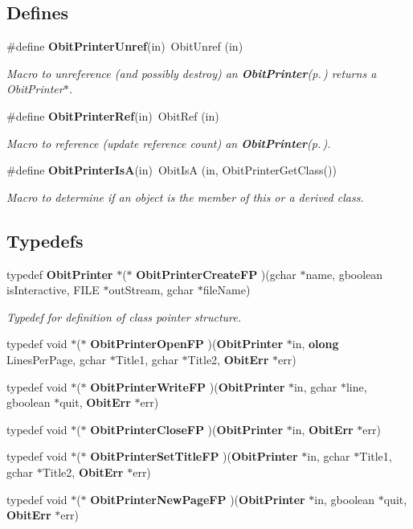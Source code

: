 \subsection*{Defines}
\begin{CompactItemize}
\item 
\#define {\bf Obit\-Printer\-Unref}(in)\ Obit\-Unref (in)
\begin{CompactList}\small\item\em Macro to unreference (and possibly destroy) an {\bf Obit\-Printer}{\rm (p.\,\pageref{structObitPrinter})} returns a Obit\-Printer$\ast$. \item\end{CompactList}\item 
\#define {\bf Obit\-Printer\-Ref}(in)\ Obit\-Ref (in)
\begin{CompactList}\small\item\em Macro to reference (update reference count) an {\bf Obit\-Printer}{\rm (p.\,\pageref{structObitPrinter})}. \item\end{CompactList}\item 
\#define {\bf Obit\-Printer\-Is\-A}(in)\ Obit\-Is\-A (in, Obit\-Printer\-Get\-Class())
\begin{CompactList}\small\item\em Macro to determine if an object is the member of this or a derived class. \item\end{CompactList}\end{CompactItemize}
\subsection*{Typedefs}
\begin{CompactItemize}
\item 
typedef {\bf Obit\-Printer} $\ast$($\ast$ {\bf Obit\-Printer\-Create\-FP} )(gchar $\ast$name, gboolean is\-Interactive, FILE $\ast$out\-Stream, gchar $\ast$file\-Name)
\begin{CompactList}\small\item\em Typedef for definition of class pointer structure. \item\end{CompactList}\item 
typedef void $\ast$($\ast$ {\bf Obit\-Printer\-Open\-FP} )({\bf Obit\-Printer} $\ast$in, {\bf olong} Lines\-Per\-Page, gchar $\ast$Title1, gchar $\ast$Title2, {\bf Obit\-Err} $\ast$err)
\item 
typedef void $\ast$($\ast$ {\bf Obit\-Printer\-Write\-FP} )({\bf Obit\-Printer} $\ast$in, gchar $\ast$line, gboolean $\ast$quit, {\bf Obit\-Err} $\ast$err)
\item 
typedef void $\ast$($\ast$ {\bf Obit\-Printer\-Close\-FP} )({\bf Obit\-Printer} $\ast$in, {\bf Obit\-Err} $\ast$err)
\item 
typedef void $\ast$($\ast$ {\bf Obit\-Printer\-Set\-Title\-FP} )({\bf Obit\-Printer} $\ast$in, gchar $\ast$Title1, gchar $\ast$Title2, {\bf Obit\-Err} $\ast$err)
\item 
typedef void $\ast$($\ast$ {\bf Obit\-Printer\-New\-Page\-FP} )({\bf Obit\-Printer} $\ast$in, gboolean $\ast$quit, {\bf Obit\-Err} $\ast$err)
\end{CompactItemize}
